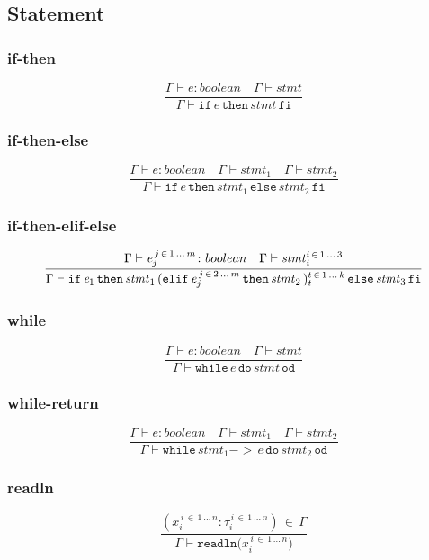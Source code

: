 \documentclass[a4paper,12pt]{article}
\newcommand\resw[1]{\mathtt{#1}}
\newcommand\mi[1]{\mathit{#1}}
\begin{document}
    \subsection{Statement}
    	\subsubsection{if-then}
	\[
		\frac{\Gamma \vdash \mi{e} \colon boolean \quad \Gamma \vdash \mi{stmt}}%
		{\Gamma \vdash \resw{if} \, \mi{e} \, \resw{then} \, \mi{stmt} \, \resw{fi}}
	\]
	\subsubsection{if-then-else}
	\[
		\frac{\Gamma \vdash \mi{e} \colon boolean \quad \Gamma \vdash \mi{stmt}_{1} \quad \Gamma \vdash \mi{stmt}_{2}}%
		{\Gamma \vdash \resw{if} \, \mi{e} \, \resw{then} \, \mi{stmt}_{1} \, \resw{else} \, \mi{stmt}_{2} \, \resw{fi}}
	\]
	\subsubsection{if-then-elif-else}
	\[
		\frac{\Gamma \vdash \mi{e}_{j}^{\, j \, \in \, 1 \, \dots \, m} \colon boolean \quad %
		\Gamma \vdash \mi{stmt}_{i}^{i \, \in \, 1 \, \dots \, 3}}%
		{%
		\Gamma \vdash  \resw{if} \, \mi{e}_{1} \, \resw{then} \, \mi{stmt}_{1}  \,
		 (\resw{elif} \, \mi{e}_{j}^{\, j \, \in \, 2 \, \dots \, m} \, \resw{then} \, \mi{stmt}_{2}\,)_{t}^{t \, \in \, 1 \, \dots \, k} \,
		  \resw{else} \, \mi{stmt}_{3} \, \resw{fi}
		}%
	\]
	\subsubsection{while}
	\[
		\frac{\Gamma \vdash \mi{e} \colon boolean \quad \Gamma \vdash \mi{stmt}}%
		{\Gamma \vdash \resw{while} \, \mi{e} \, \resw{do}\, \mi{stmt} \, \resw{od}}
	\]
	\subsubsection{while-return}
	\[
		\frac{\Gamma \vdash \mi{e} \colon boolean \quad \Gamma \vdash \mi{stmt}_{1} \quad \Gamma \vdash \mi{stmt}_{2}}%
		{\Gamma \vdash \resw{while} \, \mi{stmt}_{1}  \resw{-\!\!>}\, \mi{e} \, \resw{do}\, \mi{stmt}_{2} \, \resw{od}}
	\]
	\subsubsection{readln}
	\[
		\frac{(x_{i}^{\, i \, \in \, 1 \, \dots \, n} \colon \tau_{i}^{\, i \, \in \, 1 \, \dots \, n}) \, \in \, \Gamma}%
		{\Gamma \vdash \resw{readln(} \mi{x}_{i}^{\, i \, \in \, 1 \, \dots \, n} \resw{)}}
	\]
\end{document}
